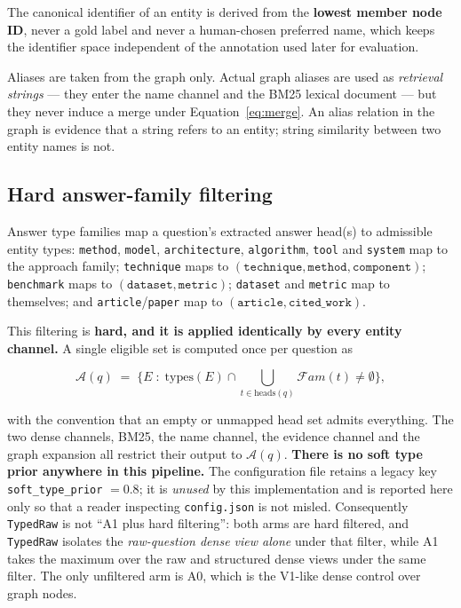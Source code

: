 \documentclass[11pt,a4paper]{article}
\begin{document}
The canonical identifier of an entity is derived from the \textbf{lowest member node ID}, never a gold label
and never a human-chosen preferred name, which keeps the identifier space independent of the annotation used
later for evaluation.

Aliases are taken from the graph only. Actual graph aliases are used as \emph{retrieval strings} --- they
enter the name channel and the BM25 lexical document --- but they never induce a merge under
Equation~\eqref{eq:merge}. An alias relation in the graph is evidence that a string refers to an entity;
string similarity between two entity names is not.

\subsection{Hard answer-family filtering}
\label{sec:hardfilter}

Answer type families map a question's extracted answer head(s) to admissible entity types:
\texttt{method}, \texttt{model}, \texttt{architecture}, \texttt{algorithm}, \texttt{tool} and
\texttt{system} map to the approach family; \texttt{technique} maps to
$(\texttt{technique}, \texttt{method}, \texttt{component})$; \texttt{benchmark} maps to
$(\texttt{dataset}, \texttt{metric})$; \texttt{dataset} and \texttt{metric} map to themselves; and
\texttt{article}/\texttt{paper} map to $(\texttt{article}, \texttt{cited\_work})$.

This filtering is \textbf{hard, and it is applied identically by every entity channel.} A single eligible
set is computed once per question as

\begin{equation}
\mathcal{A}(q) \;=\; \bigl\{E \;:\; \text{types}(E) \cap \textstyle\bigcup_{t \in \text{heads}(q)} \mathcal{F}am(t) \neq \emptyset \bigr\},
\label{eq:allowed}
\end{equation}

with the convention that an empty or unmapped head set admits everything. The two dense channels, BM25, the
name channel, the evidence channel and the graph expansion all restrict their output to $\mathcal{A}(q)$.
\textbf{There is no soft type prior anywhere in this pipeline.} The configuration file retains a legacy key
\texttt{soft\_type\_prior} $= 0.8$; it is \emph{unused} by this implementation and is reported here only so
that a reader inspecting \texttt{config.json} is not misled. Consequently \texttt{TypedRaw} is not ``A1 plus
hard filtering'': both arms are hard filtered, and \texttt{TypedRaw} isolates the \emph{raw-question dense
view alone} under that filter, while A1 takes the maximum over the raw and structured dense views under the
same filter. The only unfiltered arm is A0, which is the V1-like dense control over graph nodes.
\end{document}
